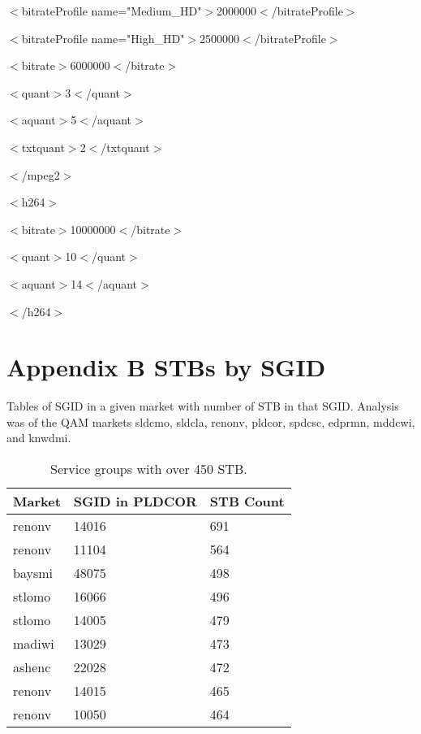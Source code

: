 \documentclass{article}
\begin{document}
$<$bitrateProfile name="Medium\_HD"$>$2000000$<$/bitrateProfile$>$

$<$bitrateProfile name="High\_HD"$>$2500000$<$/bitrateProfile$>$

$<$bitrate$>$6000000$<$/bitrate$>$

$<$quant$>$3$<$/quant$>$

$<$aquant$>$5$<$/aquant$>$

$<$txtquant$>$2$<$/txtquant$>$

$<$/mpeg2$>$

$<$h264$>$

$<$bitrate$>$10000000$<$/bitrate$>$

$<$quant$>$10$<$/quant$>$

$<$aquant$>$14$<$/aquant$>$

$<$/h264$>$



\newpage

\section{Appendix B\: STBs by SGID}
\label{APPENDIX-CustBySGID}

Tables of SGID in a given market with number of STB in that SGID. Analysis was of the QAM markets sldcmo, sldcla, renonv, pldcor, spdcsc, edprmn, mddcwi, and knwdmi. 

\begin{table}[h]
\centering
\begin{tabular}{|l|l|l|} 
\hline Market & SGID in PLDCOR & STB Count \\
\hline renonv & 14016 & 691 \\  
\hline renonv & 11104 & 564 \\
\hline baysmi & 48075 & 498 \\
\hline stlomo & 16066 & 496 \\
\hline stlomo & 14005 & 479 \\
\hline madiwi & 13029 & 473 \\
\hline ashenc & 22028 & 472 \\
\hline renonv & 14015 & 465 \\
\hline renonv & 10050 & 464 \\
\hline
\end{tabular}
\caption{\label{TABLE-HighSGUse} Service groups with over 450 STB.} 
\end{table}
\end{document}
